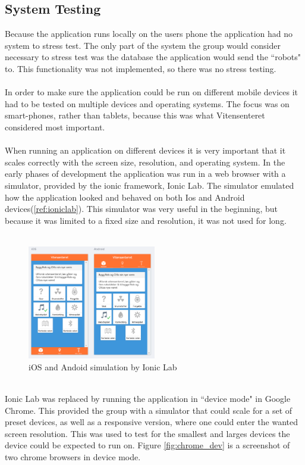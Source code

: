 \subsection{System Testing}
Because the application runs locally on the users phone the application had no system to stress test. The only part of the system the group would consider necessary to stress test was the database the application would send the ``robots" to. This functionality was not implemented, so there was no stress testing.\\
\\
In order to make sure the application could be run on different mobile devices it had to be tested on multiple devices and operating systems. The focus was on smart-phones, rather than tablets, because this was what Vitensenteret considered most important. \\
\\
When running an application on different devices it is very important that it scales correctly with the screen size, resolution, and operating system. In the early phases of development the application was run in a web browser with a simulator, provided by the ionic framework, Ionic Lab. The simulator emulated how the application looked and behaved on both Ios and Android devices(\ref{ref:ioniclab}). This simulator was very useful in the beginning, but because it was limited to a fixed size and resolution, it was not used for long.
\\\\
\begin{figure}[H]\label{ref:ioniclab}
\centering
    \includegraphics[width=0.5\textwidth]{images/ioniclab.PNG}
    \caption{iOS and Andoid simulation by Ionic Lab}
    \label{fig:console_output}
    
\end{figure}
\\
Ionic Lab was replaced by running the application in ``device mode" in Google Chrome. This provided the group with a simulator that could scale for a set of preset devices, as well as a responsive version, where one could enter the wanted screen resolution. This was used to test for the smallest and larges devices the device could be expected to run on. Figure \ref{fig:chrome_dev} is a screenshot of two chrome browsers in device mode.
